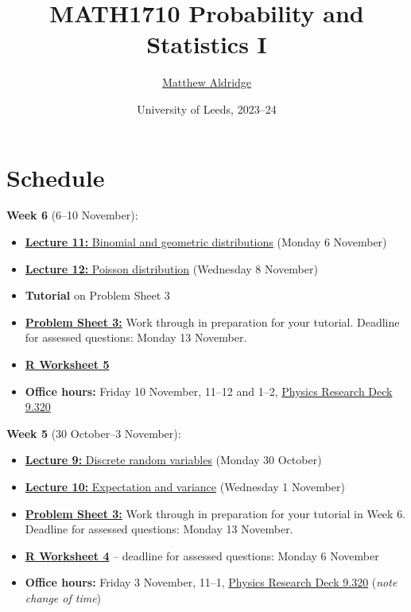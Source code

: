 \documentclass[
  a4paper,
]{book}
\title{MATH1710 Probability and Statistics I}
\author{\href{https://mpaldridge.github.io/}{Matthew Aldridge}}
\date{University of Leeds, 2023--24}
\providecommand{\tightlist}{%
  \setlength{\itemsep}{0pt}\setlength{\parskip}{0pt}}
\theoremstyle{definition}
\theoremstyle{definition}
\theoremstyle{definition}
\theoremstyle{definition}
\theoremstyle{remark}
\begin{document}
\maketitle

{
\setcounter{tocdepth}{1}
\tableofcontents
}
\hypertarget{schedule}{%
\chapter*{Schedule}\label{schedule}}

\newcommand{\Var}{\operatorname{Var}}

\textbf{Week 6} (6--10 November):

\begin{itemize}
\tightlist
\item
  \protect\hyperlink{L11-binomial-geometric}{\textbf{Lecture 11:} Binomial and geometric distributions} (Monday 6 November)
\item
  \protect\hyperlink{L12-poisson}{\textbf{Lecture 12:} Poisson distribution} (Wednesday 8 November)
\item
  \textbf{Tutorial} on Problem Sheet 3
\item
  \protect\hyperlink{P3}{\textbf{Problem Sheet 3:}} Work through in preparation for your tutorial. Deadline for assessed questions: Monday 13 November.
\item
  \protect\hyperlink{R}{\textbf{R Worksheet 5}}
\item
  \textbf{Office hours:} Friday 10 November, 11--12 and 1--2, \href{https://mpaldridge.github.io/office.html}{Physics Research Deck 9.320}
\end{itemize}

\textbf{Week 5} (30 October--3 November):

\begin{itemize}
\tightlist
\item
  \protect\hyperlink{L09-discrete-rv}{\textbf{Lecture 9:} Discrete random variables} (Monday 30 October)
\item
  \protect\hyperlink{L10-expectation}{\textbf{Lecture 10:} Expectation and variance} (Wednesday 1 November)
\item
  \protect\hyperlink{P3}{\textbf{Problem Sheet 3:}} Work through in preparation for your tutorial in Week 6. Deadline for assessed questions: Monday 13 November.
\item
  \protect\hyperlink{R}{\textbf{R Worksheet 4}} -- deadline for assessed questions: Monday 6 November
\item
  \textbf{Office hours:} Friday 3 November, 11--1, \href{https://mpaldridge.github.io/office.html}{Physics Research Deck 9.320} (\emph{note change of time})
\end{itemize}
\end{document}
